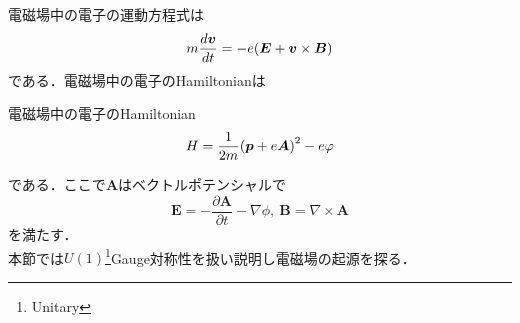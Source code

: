 \documentclass{standalone}
\begin{document}
  電磁場中の電子の運動方程式は
  \begin{equation}
    m\frac{d\bm{v}}{dt}=-e\qty(\bm{E}+\bm{v}\times\bm{B})
  \end{equation}
  である．電磁場中の電子のHamiltonianは
  \begin{itembox}[l]{電磁場中の電子のHamiltonian}
    \begin{equation}
      H=\frac{1}{2m}\qty(\bm{p}+e\bm{A})^2-e\varphi
    \end{equation}
  \end{itembox}
  である．ここで$\bm{A}$はベクトルポテンシャルで
  \begin{equation}
    \bm{E}=-\frac{\partial \bm{A}}{\partial t}-\nabla\phi,\ \bm{B}=\nabla\times\bm{A}
  \end{equation}
  を満たす．\\
  本節では$U(1)$\footnote{Unitary}Gauge対称性を扱い説明し電磁場の起源を探る．
\end{document}
